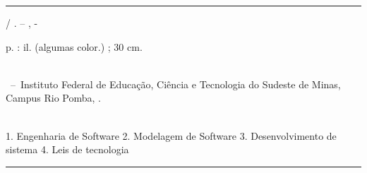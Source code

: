 \documentclass[
	12pt,				%
	openright,			%
	oneside,			%
	a4paper,			%
	english,			%
	french,				%
	spanish,			%
	brazil,				%
	]{abntex2}
\begin{document}
%
%     
\begin{fichacatalografica}
	\vspace*{\fill}					%
	\hrule							%
	\begin{center}					%
	\begin{minipage}[c]{12.5cm}		%
	
	\imprimirautor
	
	\hspace{0.5cm} \imprimirtitulo  / \imprimirautor. --
	\imprimirlocal, \imprimirdata-
	
	\hspace{0.5cm} \pageref{LastPage} p. : il. (algumas color.) ; 30 cm.\\
	
	\hspace{0.5cm} \imprimirorientadorRotulo~\imprimirorientador\\
	
	\hspace{0.5cm}
	\parbox[t]{\textwidth}{\imprimirtipotrabalho~--~Instituto Federal de Educação, Ciência e Tecnologia do Sudeste de Minas, Campus Rio Pomba,
	\imprimirdata.}\\
	
	\hspace{0.5cm}
		1. Engenharia de Software
		2. Modelagem de Software
		3. Desenvolvimento de sistema
        4. Leis de tecnologia
  \\ 			
	
	\hspace{8.75cm} %
	
	\end{minipage}
	\end{center}
	\hrule
\end{fichacatalografica}

\end{document}
